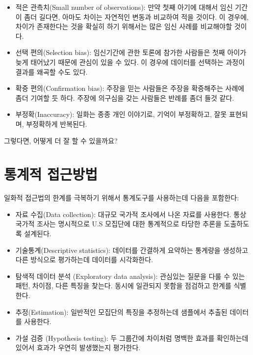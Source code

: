 \begin{itemize}

\item 적은 관측치(Small number of observations): 만약 첫째 아기에 대해서 임신 기간이 좀더 길다면, 아마도 차이는 자연적인 변동과 비교하여 적을 것이다. 이 경우에, 차이가 존재한다는 것을 확실히 하기 위해서는 많은 임신 사례를 비교해야할 것이다. 

\item 선택 편의(Selection bias): 임신기간에 관한 토론에 참가한 사람들은 첫째 아이가 늦게 태어났기 때문에 관심이 있을 수 있다. 이 경우에 데이터를 선택하는 과정이 결과를 왜곡할 수도 있다.

\item 확증 편의(Confirmation bias): 주장을 믿는 사람들은 주장을 확증해주는 사례에 좀더 기여할 듯 하다. 주장에 의구심을 갖는 사람들은  반례를 좀더 들것 같다. 

\item 부정확(Inaccuracy): 일화는 종종 개인 이야기로, 기억이 부정확하고, 잘못 표현되며, 부정확하게 반복된다. 

\end{itemize}

그렇다면, 어떻게 더 잘 할 수 있을까요?


\section{통계적 접근방법}

일화적 접근법의 한계를 극복하기 위해서 통계도구를 사용하는데 다음을 포함한다:

\begin{itemize}

\item 자료 수집(Data collection): 
  대규모 국가적 조사에서 나온 자료를 사용한다. 통상 국가적 조사는 명시적으로 U.S 모집단에 대한 
  통계적으로 타당한 추론을 도출하도록 설계된다.

\item 기술통계(Descriptive statistics): 
  데이터를 간결하게 요약하는 통계량을 생성하고 다른 방식으로 평가하는데 데이터를 시각화한다.

\item 탐색적 데이터 분석 (Exploratory data analysis): 
  관심있는 질문을 다룰 수 있는 패턴, 차이점, 다른 특징을 찾는다. 
  동시에 일관되지 못함을 점검하고 한계를 식별한다.

\item 추정(Estimation): 
  일반적인 모집단의 특징을 추정하는데 샘플에서 추출된 데이터를 사용한다.

\item 가설 검증 (Hypothesis testing): 
  두 그룹간에 차이처럼 명백한 효과를 확인하는데 있어서 효과가 우연히 발생했는지 평가한다.

\end{itemize}

